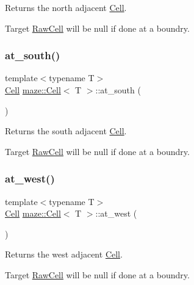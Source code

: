 Returns the north adjacent \hyperlink{classmaze_1_1Cell}{Cell}. 

Target \hyperlink{classmaze_1_1RawCell}{Raw\+Cell} will be null if done at a boundry. \mbox{\label{classmaze_1_1Cell_a3b188f082fad9e2d67fe044d80889936}} 
\subsubsection{\texorpdfstring{at\+\_\+south()}{at\_south()}}
{\footnotesize\ttfamily template$<$typename T$>$ \\
\hyperlink{classmaze_1_1Cell}{Cell} \hyperlink{classmaze_1_1Cell}{maze\+::\+Cell}$<$ T $>$\+::at\+\_\+south (\begin{DoxyParamCaption}{ }\end{DoxyParamCaption})}



Returns the south adjacent \hyperlink{classmaze_1_1Cell}{Cell}. 

Target \hyperlink{classmaze_1_1RawCell}{Raw\+Cell} will be null if done at a boundry. \mbox{\label{classmaze_1_1Cell_a4080c57302de14134648c386f3798428}} 
\subsubsection{\texorpdfstring{at\+\_\+west()}{at\_west()}}
{\footnotesize\ttfamily template$<$typename T$>$ \\
\hyperlink{classmaze_1_1Cell}{Cell} \hyperlink{classmaze_1_1Cell}{maze\+::\+Cell}$<$ T $>$\+::at\+\_\+west (\begin{DoxyParamCaption}{ }\end{DoxyParamCaption})}



Returns the west adjacent \hyperlink{classmaze_1_1Cell}{Cell}. 

Target \hyperlink{classmaze_1_1RawCell}{Raw\+Cell} will be null if done at a boundry. \mbox{\label{classmaze_1_1Cell_a1e56e5f417f35081cfed62d6346937f5}} 

